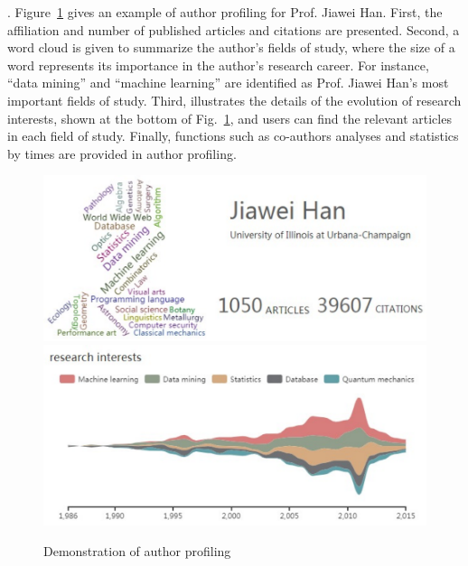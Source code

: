 



.
Figure~\ref{fig:hjwProfile} gives an example of author profiling for Prof. Jiawei Han.
First, the affiliation and number of published articles and citations are presented.
Second, a word cloud is given to summarize the author's fields of study, where the size of a word represents its importance in the author's research career. For instance, ``data mining'' and ``machine learning'' are identified as Prof. Jiawei Han's most important fields of study.
Third, \oursystem illustrates the details of the evolution of research interests, shown at the bottom of Fig.~\ref{fig:hjwProfile}, and users can find the relevant articles in each field of study.
Finally, functions such as co-authors analyses and statistics by times are provided in author profiling.



\begin{figure}
\centering
\includegraphics[width=0.98\columnwidth]{hjwAvatar.pdf}
\includegraphics[width=\columnwidth]{hjwInterest.pdf}
\vspace{-3ex}
\caption{Demonstration of author profiling }
\label{fig:hjwProfile}
\vspace{-3.5ex}
\end{figure}


